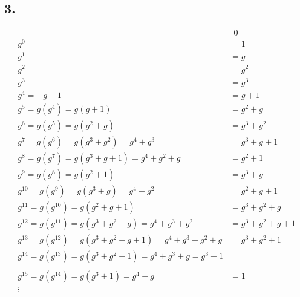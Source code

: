 \documentclass[11pt]{article}
\begin{document}
\subsection*{3.}
\begin{equation}
\begin{split}
&\ \ 0\\
g^0&=1\\
g^1&=g\\
g^2&=g^2\\
g^3&=g^3\\
g^4=-g-1&=g+1\\
g^5=g(g^4)=g(g+1)&=g^2+g\\
g^6=g(g^5)=g(g^2+g)&=g^3+g^2\\
g^7=g(g^6)=g(g^3+g^2)=g^4+g^3&=g^3+g+1\\
g^8=g(g^7)=g(g^3+g+1)=g^4+g^2+g&=g^2+1\\
g^9=g(g^8)=g(g^2+1)&=g^3+g\\
g^{10}=g(g^9)=g(g^3+g)=g^4+g^2&=g^2+g+1\\
g^{11}=g(g^{10})=g(g^2+g+1)&=g^3+g^2+g\\
g^{12}=g(g^{11})=g(g^3+g^2+g)=g^4+g^3+g^2&=g^3+g^2+g+1\\
g^{13}=g(g^{12})=g(g^3+g^2+g+1)=g^4+g^3+g^2+g&=g^3+g^2+1\\
g^{14}=g(g^{13})=g(g^3+g^2+1)=g^4+g^3+g=g^3+1\\
\\
g^{15}=g(g^{14})=g(g^3+1)=g^4+g&=1\\
\vdots
\end{split}
\end{equation}
\end{document}
